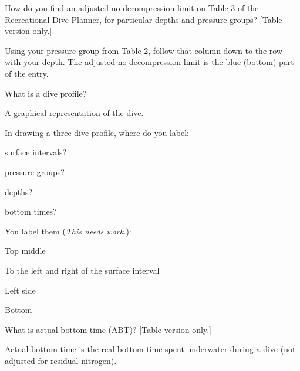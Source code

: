 	\begin{qanda}
		\begin{question}
How do you find an adjusted no decompression limit on Table 3 of the Recreational Dive Planner, for particular depths and pressure groups? [Table version only.]
		\end{question}

		\begin{answer}
Using your pressure group from Table 2, follow that column down to the row with your depth.  The adjusted no decompression limit is the blue (bottom) part of the entry.
		\end{answer}
	\end{qanda}

	\begin{qanda}
		\begin{question}
What is a dive profile?
		\end{question}

		\begin{answer}
A graphical representation of the dive.
		\end{answer}
	\end{qanda}

	\begin{qanda}
		\begin{question}
In drawing a three-dive profile, where do you label:
			\begin{nospacenumberedlist}
				\item surface intervals?
				\item pressure groups?
				\item depths?
				\item bottom times?
			\end{nospacenumberedlist}
		\end{question}

		\begin{answer}
You label them (\emph{This needs work.}):
			\begin{nospacenumberedlist}
				\item Top middle
				\item To the left and right of the surface interval
				\item Left side
				\item Bottom
			\end{nospacenumberedlist}
		\end{answer}
	\end{qanda}

	\begin{qanda}
		\begin{question}
What is actual bottom time (ABT)? [Table version only.]
		\end{question}

		\begin{answer}
Actual bottom time is the real bottom time spent underwater during a dive (not adjusted for residual nitrogen).
		\end{answer}
	\end{qanda}

